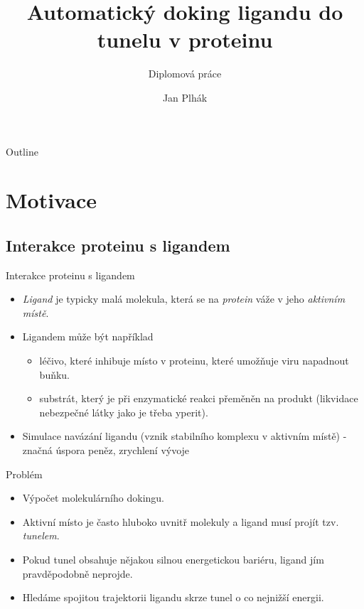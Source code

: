 \documentclass{beamer}
\title[Doking ligandu do tunelu v proteinu]{Automatický doking ligandu do tunelu v proteinu}
\subtitle{Diplomová práce}
\author{Jan Plhák}
\date{}
\begin{document}
\begin{frame}
  \titlepage
\end{frame}

\begin{frame}{Outline}
  \tableofcontents
\end{frame}

\section{Motivace}
\subsection{Interakce proteinu s ligandem}
\begin{frame}{Interakce proteinu s ligandem}
  \begin{itemize}
  \item {
    \textit{Ligand} je typicky malá molekula, která se na \textit{protein} váže  v jeho \textit{aktivním místě}.
    }
    
  \item {
      Ligandem může být například
      \begin{itemize}
     		\item léčivo, které inhibuje místo v proteinu, které umožňuje viru napadnout buňku.
     		\item substrát, který je při enzymatické reakci přeměněn na produkt (likvidace nebezpečné látky jako je třeba yperit).
     \end{itemize}
  }
  
  \item {
  		Simulace navázání ligandu (vznik stabilního komplexu v aktivním místě) - značná úspora peněz, zrychlení vývoje
  }
  \end{itemize}
\end{frame}


\begin{frame}{Problém}
  \begin{itemize}
  \item {
    	Výpočet molekulárního dokingu.
    }
  \item {
    	Aktivní místo je často hluboko uvnitř molekuly a ligand musí projít tzv. \textit{tunelem}.
    }
    \item {
    	Pokud tunel obsahuje nějakou silnou energetickou bariéru, ligand jím pravděpodobně neprojde.
    }
    \item {
    	Hledáme spojitou trajektorii ligandu skrze tunel o co nejnižší energii.
    }
  \end{itemize}
\end{frame}
\end{document}
